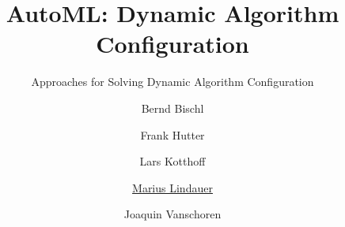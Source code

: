 



\title[AutoML: DAC]{AutoML: Dynamic Algorithm Configuration}
\subtitle{Approaches for Solving Dynamic Algorithm Configuration}
\author[Marius Lindauer]{Bernd Bischl \and Frank Hutter \and Lars Kotthoff\newline \and \underline{Marius Lindauer} \and Joaquin Vanschoren}
\institute{}
\date{}





	
	\maketitle
	

